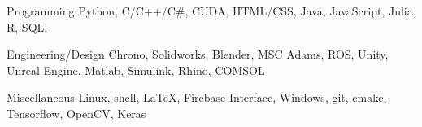 

\begin{cvskills}

  \cvskill
    {Programming} %
    {Python, C/C++/C\#, CUDA, HTML/CSS, Java, JavaScript, Julia, R, SQL.} %

\cvskill
{Engineering/Design} %
{Chrono, Solidworks, Blender, MSC Adams, ROS, Unity, Unreal Engine, Matlab, Simulink, Rhino, COMSOL} %

  \cvskill
    {Miscellaneous} %
    {Linux, shell, \LaTeX, Firebase Interface, Windows, git, cmake, Tensorflow, OpenCV, Keras} %
   


\end{cvskills}
